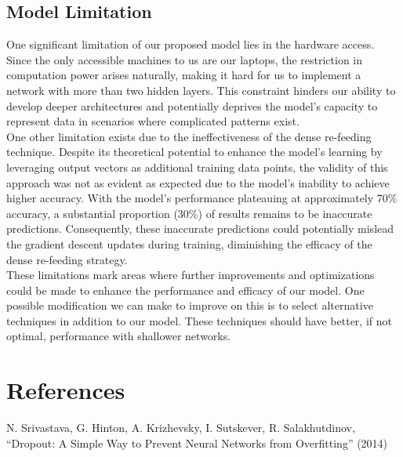 \documentclass{article}
\begin{document}
\subsection{Model Limitation}
One significant limitation of our proposed model lies in the hardware access. Since the only accessible machines to us are our laptops, the restriction in computation power arises naturally, making it hard for us to implement a network with more than two hidden layers. This constraint hinders our ability to develop deeper architectures and potentially deprives the model's capacity to represent data in scenarios where complicated patterns exist.\\

\noindent One other limitation exists due to the ineffectiveness of the dense re-feeding technique. Despite its theoretical potential to enhance the model's learning by leveraging output vectors as additional training data points, the validity of this approach was not as evident as expected due to the model's inability to achieve higher accuracy. With the model's performance plateauing at approximately 70\% accuracy, a substantial proportion (30\%) of results remains to be inaccurate predictions. Consequently, these inaccurate predictions could potentially mislead the gradient descent updates during training, diminishing the efficacy of the dense re-feeding strategy.\\

\noindent These limitations mark areas where further improvements and optimizations could be made to enhance the performance and efficacy of our model. One possible modification we can make to improve on this is to select alternative techniques in addition to our model. These techniques should have better, if not optimal, performance with shallower networks. 

\section{References}
    N. Srivastava, G. Hinton, A. Krizhevsky, I. Sutskever, R. Salakhutdinov, “Dropout: A Simple Way to Prevent Neural Networks from Overfitting” (2014)
\end{document}
